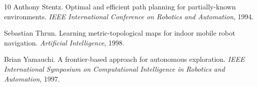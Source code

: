 \documentclass{article}
\begin{document}
\begin{thebibliography}{10}
Anthony Stentz.
\newblock Optimal and efficient path planning for partially-known environments.
\newblock \emph{IEEE International Conference on Robotics and Automation}, 1994.

Sebastian Thrun.
\newblock Learning metric-topological maps for indoor mobile robot navigation.
\newblock \emph{Artificial Intelligence}, 1998.

Brian Yamauchi.
\newblock A frontier-based approach for autonomous exploration.
\newblock \emph{IEEE International Symposium on Computational Intelligence in Robotics and Automation}, 1997.

\end{thebibliography}
\end{document}

